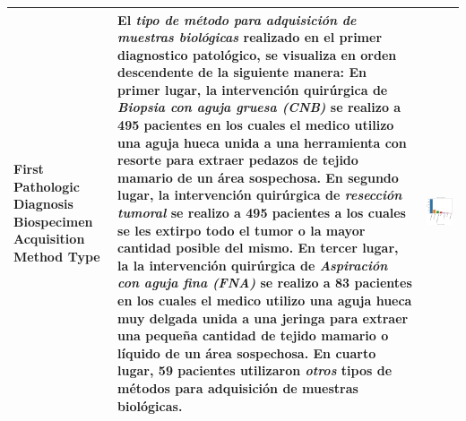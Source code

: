 \begin{table}[!htb]
\begin{threeparttable}
\begin{tabular}{p{2.5cm} p{7cm} p{6.5cm}}
			First Pathologic Diagnosis Biospecimen Acquisition Method Type
			& El \textit{tipo de método para adquisición de muestras biológicas} realizado en el primer diagnostico patológico, se visualiza en orden descendente de la siguiente manera: En primer lugar, la intervención quirúrgica de \textit{Biopsia con aguja gruesa (CNB)} se realizo a 495 pacientes en los cuales el medico utilizo una aguja hueca unida a una herramienta con resorte para extraer pedazos de tejido mamario de un área sospechosa. En segundo lugar, la intervención quirúrgica de \textit{resección tumoral} se realizo a 495 pacientes a los cuales se les extirpo todo el tumor o la mayor cantidad posible del mismo. En tercer lugar, la la intervención quirúrgica de \textit{Aspiración con aguja fina (FNA)} se realizo a 83 pacientes en los cuales el medico utilizo una aguja hueca muy delgada unida a una jeringa para extraer una pequeña cantidad de tejido mamario o líquido de un área sospechosa. En cuarto lugar, 59 pacientes utilizaron \textit{otros} tipos de métodos para adquisición de muestras biológicas. 
			& \begin{center}\includegraphics[width=1\linewidth]{NOTEBOOK/IMAGENES_DESCRIPTIVAS/34_biospecimen_method}\end{center}
			\\ \hline
		\end{tabular}
	\end{threeparttable}
\end{table}

